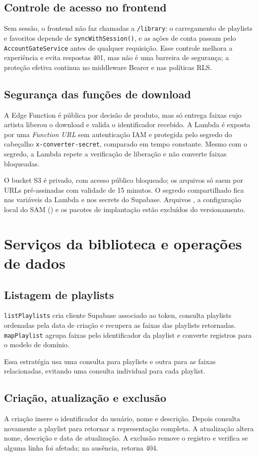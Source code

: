 \documentclass[12pt,a4paper,oneside]{report}
\newcommand{\arquivo}[1]{\texttt{\detokenize{#1}}}
\begin{document}
\section{Controle de acesso no frontend}
Sem sessão, o frontend não faz chamadas a \texttt{/library}: o carregamento de playlists e favoritos depende de \texttt{syncWithSession()}, e as ações de conta passam pelo \texttt{AccountGateService} antes de qualquer requisição. Esse controle melhora a experiência e evita respostas 401, mas não é uma barreira de segurança; a proteção efetiva continua no middleware Bearer e nas políticas RLS.

\section{Segurança das funções de download}
A Edge Function é pública por decisão de produto, mas só entrega faixas cujo artista liberou o download e valida o identificador recebido. A Lambda é exposta por uma \emph{Function URL} sem autenticação IAM e protegida pelo segredo do cabeçalho \texttt{x-converter-secret}, comparado em tempo constante. Mesmo com o segredo, a Lambda repete a verificação de liberação e não converte faixas bloqueadas.

O bucket S3 é privado, com acesso público bloqueado; os arquivos só saem por URLs pré-assinadas com validade de 15 minutos. O segredo compartilhado fica nas variáveis da Lambda e nos secrets do Supabase. Arquivos \arquivo{.env}, a configuração local do SAM (\arquivo{samconfig.toml}) e os pacotes de implantação estão excluídos do versionamento.

\chapter{Serviços da biblioteca e operações de dados}
\section{Listagem de playlists}
\texttt{listPlaylists} cria cliente Supabase associado ao token, consulta playlists ordenadas pela data de criação e recupera as faixas das playlists retornadas. \texttt{mapPlaylist} agrupa faixas pelo identificador da playlist e converte registros para o modelo de domínio.

Essa estratégia usa uma consulta para playlists e outra para as faixas relacionadas, evitando uma consulta individual para cada playlist.

\section{Criação, atualização e exclusão}
A criação insere o identificador do usuário, nome e descrição. Depois consulta novamente a playlist para retornar a representação completa. A atualização altera nome, descrição e data de atualização. A exclusão remove o registro e verifica se alguma linha foi afetada; na ausência, retorna 404.
\end{document}

